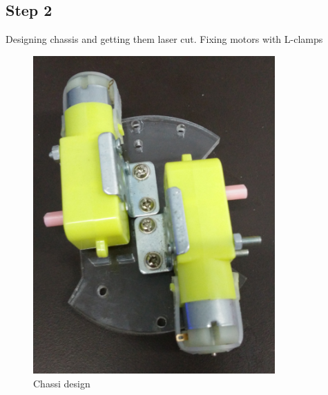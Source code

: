 \documentclass[a4paper,12pt,oneside]{book}
\begin{document}
\subsection*{Step 2}
Designing chassis and getting them laser cut. Fixing motors with L-clamps 
\hfill\\
\begin{figure}[h!]
	\caption{Chassi design}
	\includegraphics[width=350px]{./Pictures/Chassis_Design}		
\end{figure}	
\hfill\\
\newpage        
\end{document}
